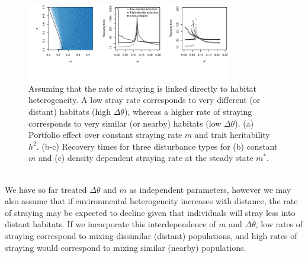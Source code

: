 \documentclass[twocolumn,preprintnumbers,amsmath,amssymb,superscriptaddress]{revtex4}
\begin{document}
\begin{figure}
  \captionsetup{justification=raggedright,
singlelinecheck=false
}
  \centering
  \includegraphics[width=0.8\textwidth]{figs2/fig_MDPE_hm_mtheta_rt.pdf}
  \caption{
  Assuming that the rate of straying is linked directly to habitat heterogeneity. A low stray rate corresponds to very different (or distant) habitats (high $\Delta\theta$), whereas a higher rate of straying corresponds to very similar (or nearby) habitats (low $\Delta\theta$).
  (a) Portfolio effect over constant straying rate $m$ and trait heritability $h^2$.
  (b-c) Recovery times for three disturbance types for (b) constant $m$ and (c) density dependent straying rate at the steady state $m^*$.
  } \label{fig:mtheta}
\end{figure}



\\ 
\noindent We have so far treated $\Delta\theta$ and $m$ as independent parameters, however we may also assume that if environmental heterogeneity increases with distance, the rate of straying may be expected to decline given that individuals will stray less into distant habitats. %
If we incorporate this interdependence of $m$ and $\Delta\theta$, low rates of straying correspond to mixing dissimilar (distant) populations, and high rates of straying would correspond to mixing similar (nearby) populations.
\end{document}
